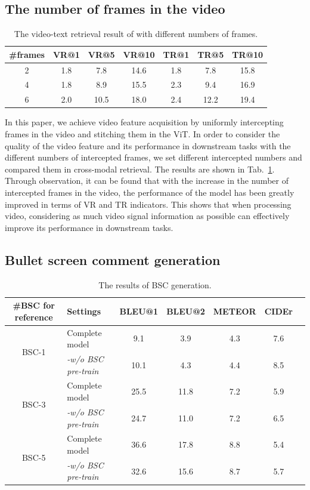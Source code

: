 \subsection{The number of frames in the video}
\label{sec:app_number_frame}

\begin{table}[t]
\centering
\begin{tabular}{c|cccccc}
\toprule
\textbf{\#frames} & \textbf{VR@1} & \textbf{VR@5} & \textbf{VR@10} & \textbf{TR@1} & \textbf{TR@5} & \textbf{TR@10} \\
\midrule
 2 & 1.8 & 7.8 & 14.6 & 1.8 & 7.8 & 15.8 \\
 4 & 1.8 & 8.9 & 15.5 & 2.3 & 9.4 & 16.9 \\
 6 & 2.0 & 10.5 & 18.0 & 2.4 & 12.2 & 19.4 \\
\bottomrule
\end{tabular}
\caption{\label{tab:frames}
The video-text retrieval result of \TVD with different numbers of frames.
}
\end{table}

In this paper, we achieve video feature acquisition by uniformly intercepting frames in the video and stitching them in the ViT.
In order to consider the quality of the video feature and its performance in downstream tasks with the different numbers of intercepted frames, we set different intercepted numbers and compared them in cross-modal retrieval. 
The results are shown in Tab.~\ref{tab:frames}.
Through observation, it can be found that with the increase in the number of intercepted frames in the video, the performance of the model has been greatly improved in terms of VR and TR indicators.
This shows that when processing video, considering as much video signal information as possible can effectively improve its performance in downstream tasks.


\subsection{Bullet screen comment generation}
\label{sec:app_gt}

\begin{table}
\centering
\scriptsize
\begin{tabular}{clccccc}
\toprule
\textbf{\#BSC for reference} & \textbf{Settings} & \textbf{BLEU@1} & \textbf{BLEU@2} & \textbf{METEOR} & \textbf{CIDEr} \\
\midrule
\multirow{2}{*}{BSC-1} & Complete model & 9.1 & 3.9 & 4.3 & 7.6 \\
& \textit{-w/o BSC pre-train}  & 10.1 & 4.3 & 4.4 & 8.5 \\
\midrule
\multirow{2}{*}{BSC-3} & Complete model & 25.5 & 11.8 & 7.2 & 5.9 \\
& \textit{-w/o BSC pre-train}  & 24.7 & 11.0 & 7.2 & 6.5 \\
\midrule
\multirow{2}{*}{BSC-5} & Complete model & 36.6 & 17.8 & 8.8 & 5.4 \\
& \textit{-w/o BSC pre-train}  & 32.6 & 15.6 & 8.7 & 5.7 \\
\bottomrule
\end{tabular}
\caption{\label{tab:BSC_generation}
The results of BSC generation.
}
\end{table}

